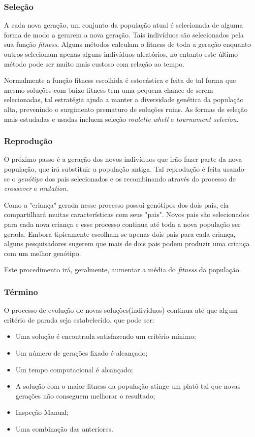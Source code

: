\subsubsection{Seleção}
A cada nova geração, um conjunto da população atual é selecionada de alguma forma de modo a gerarem a nova geração. Tais indivíduos são selecionados pela sua função \textit{fitness}. Alguns métodos calculam o fitness de toda a geração enquanto outros selecionam apenas alguns indivíduos aleatórios, no entanto este último método pode ser muito mais custoso com relação ao tempo.

Normalmente a função fitness escolhida é estocástica e feita de tal forma que mesmo soluções com baixo fitness tem uma pequena chance de serem selecionadas, tal estratégia ajuda a manter a diversidade genética da população alta, prevenindo o surgimento prematuro de soluções ruins. As formas de seleção mais estudadas e usadas incluem seleção \textit{roulette whell} e \textit{tournament selecion}.

\subsubsection{Reprodução}
O próximo passo é a geração dos novos indivíduos que irão fazer parte da nova população, que irá substituir a população antiga. Tal reprodução é feita usando-se o \textit{genótipo} dos pais selecionados e os recombinando através do processo de \textit{crossover} e \textit{mutation}.

Como a "criança" gerada nesse processo possui genótipos dos dois pais, ela compartilhará muitas características com seus "pais". Novos pais são selecionados para cada nova criança e esse processo continua até toda a nova população ser gerada. Embora tipicamente escolham-se apenas dois pais para cada criança, alguns pesquisadores \cite{Eiben2012} sugerem que mais de dois pais podem produzir uma criança com um melhor genótipo.

Este procedimento irá, geralmente, aumentar a média do \textit{fitness} da população.

\subsubsection{Término}
O processo de evolução de novas soluções(indivíduos) continua até que algum critério de parada seja estabelecido, que pode ser:
\begin{itemize}
    \item Uma solução é encontrada satisfazendo um critério mínimo;
    \item Um número de gerações fixado é alcançado;
    \item Um tempo computacional é alcançado;
    \item A solução com o maior fitness da população atinge um platô tal que novas gerações não conseguem melhorar o resultado;
    \item Inspeção Manual;
    \item Uma combinação das anteriores.
\end{itemize}




